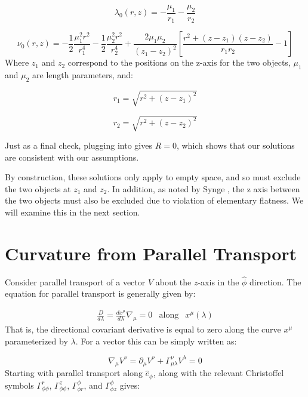 \documentclass[12pt]{article}
\begin{document}
\begin{appendices}
\begin{equation}
\lambda_0(r,z)=-\frac{\mu_1}{r_1}-\frac{\mu_2}{r_2}
\end{equation}

\begin{equation}
  \nu_0(r,z)=-\frac{1}{2}\frac{\mu_{1}^{2}r^2}{r_{1}^{4}}-\frac{1}{2}\frac{\mu_{2}^{2}r^2}{r_{2}^{4}}+\frac{2\mu_1\mu_2}{(z_1-z_2)^2}\left[\frac{r^2+(z-z_1)(z-z_2)}{r_{1}r_{2}}-1\right]
\end{equation}
Where $z_1$ and $z_2$ correspond to the positions on the z-axis for the two objects, $\mu_1$ and $\mu_2$ are length parameters, and:

\begin{equation}
r_1=\sqrt{r^2+(z-z_1)^2}
\end{equation}

\begin{equation}
r_2=\sqrt{r^2+(z-z_2)^2}
\end{equation}

Just as a final check, plugging  into  gives $R=0$, which shows that our solutions are consistent with our assumptions.

By construction, these solutions only apply to empty space, and so must exclude the two objects at $z_1$ and $z_2$. In addition, as noted by Synge \cite{synge_relativity}, the z axis between the two objects must also be excluded due to violation of elementary flatness. We will examine this in the next section.

\section{Curvature from Parallel Transport}

Consider parallel transport of a vector $V$ about the $z$-axis in
the $\hat{\phi}$ direction. The equation for parallel transport is generally given by:

\begin{equation}
\begin{array}{rcl} \frac{D}{d\lambda}=\frac{dx^{\mu}}{d\lambda}\nabla_{\mu}=0 & \mbox{along} & x^{\mu}\left(\lambda\right)
\end{array}
\end{equation}
That is, the directional covariant derivative is equal to zero along
the curve $x^{\mu}$ parameterized by $\lambda$. For a vector this can
be simply written as:

\begin{equation}
\label{eq:x-par-xport}
\nabla_\mu V^{\nu}=\partial_\mu V^\nu+\Gamma^\nu_{\mu\lambda} V^\lambda=0
\end{equation}
Starting with parallel transport along $\hat{e}_{\phi}$,  along with the relevant Christoffel symbols $\Gamma^{r}_{\phi\phi}$, $\Gamma^{z}_{\phi\phi}$, $\Gamma^{\phi}_{\phi r}$, and $\Gamma^{\phi}_{\phi z}$ gives:


\end{appendices}
\end{document}

